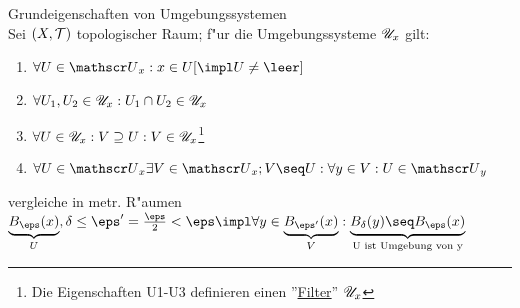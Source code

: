 \begin{satz}\label{2.8}{\sc Grundeigenschaften von Umgebungssystemen}\\
Sei $(X,\mathcal T )$ topologischer Raum; f"ur die Umgebungssysteme ${\mathscr U}_{x}$ gilt:
\begin{enumerate}[(U1)]
\item $\forall U\in\umg{U}{x}:x\in U[\impl U\neq\leer]$
\item $\forall U_1,U_2\in{\mathscr U}_{x}:U_1\cap U_2\in{\mathscr U}_{x}$
\item $\forall U\in{\mathscr U}_{x}: V\supseteq U: V\in {\mathscr U}_{x}$\footnote{Die Eigenschaften U1-U3 definieren einen ''\ul{Filter}'' ${\mathscr U}_{x}$}
\item $\forall U\in\umg{U}{x}\exists V\in\umg{U}{x}; V\seq U: \forall y\in V: U\in\umg{U}{y}$
\end{enumerate}
vergleiche in metr. R"aumen $\underbrace{B_\eps (x)}_U ,\delta\leq\eps '=\frac{\eps}{2}<\eps\impl\forall y\in \underbrace{B_{\eps '}(x)}_V:\underbrace{B_\delta (y)\seq B_\eps (x)}_{\mbox{\scriptsize U ist Umgebung von y}}\vspace*{-0.3cm}$\vspace*{-0.2cm}
\end{satz}

